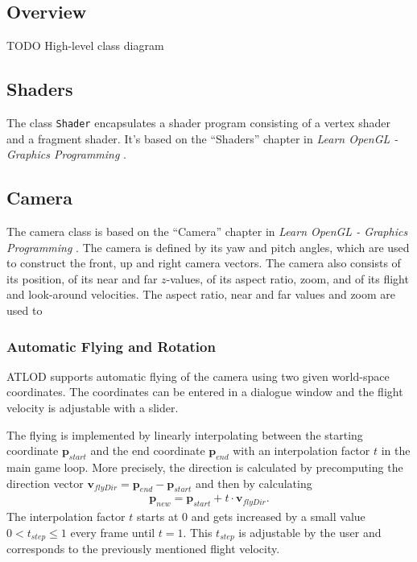 \subsection{Overview}
TODO High-level class diagram

\subsection{Shaders}
The class \texttt{Shader} encapsulates a shader program consisting of a vertex shader and a fragment shader.
It's based on the ``Shaders'' chapter in \textit{Learn OpenGL - Graphics Programming} \cite{learnopengl}.

\subsection{Camera}
The camera class is based on the ``Camera'' chapter in \textit{Learn OpenGL - Graphics Programming} \cite{learnopengl}.
The camera is defined by its yaw and pitch angles, which are used to construct the front, up and right 
camera vectors. The camera also consists of its position, of its near and far $z$-values, of its aspect ratio,
zoom, and of its flight and look-around velocities. The aspect ratio, near and far values and zoom are used to 

\subsubsection{Automatic Flying and Rotation}
ATLOD supports automatic flying of the camera using two given world-space coordinates.
The coordinates can be entered in a dialogue window and the flight velocity is adjustable with a slider.

The flying is implemented by linearly interpolating between the starting coordinate $\mathbf{p}_{start}$ 
and the end coordinate $\mathbf{p}_{end}$ with an interpolation factor $t$ in the main game loop.
More precisely, the direction is calculated by precomputing the direction vector $\mathbf{v}_{flyDir} = \mathbf{p}_{end} - \mathbf{p}_{start}$ and then by calculating
\begin{align*}
  \mathbf{p}_{new} = \mathbf{p}_{start} + t \cdot \mathbf{v}_{flyDir}.
\end{align*}
The interpolation factor $t$ starts at 0 and gets increased by a small value $0< t_{step}\leq1$ every frame until 
$t = 1$. This $t_{step}$ is adjustable by the user and corresponds to the previously mentioned flight velocity.

